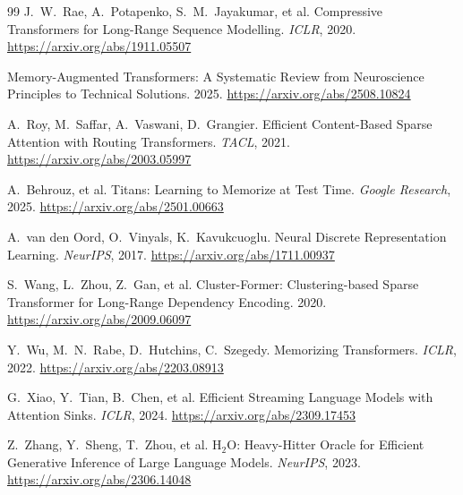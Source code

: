 \documentclass[11pt]{article}
\begin{document}
\begin{thebibliography}{99}
 J.~W.~Rae, A.~Potapenko, S.~M.~Jayakumar, et al.
Compressive Transformers for Long-Range Sequence Modelling. \emph{ICLR}, 2020.
\url{https://arxiv.org/abs/1911.05507}

 Memory-Augmented Transformers: A Systematic Review from
Neuroscience Principles to Technical Solutions. 2025. \url{https://arxiv.org/abs/2508.10824}

 A.~Roy, M.~Saffar, A.~Vaswani, D.~Grangier. Efficient
Content-Based Sparse Attention with Routing Transformers. \emph{TACL}, 2021.
\url{https://arxiv.org/abs/2003.05997}

 A.~Behrouz, et al. Titans: Learning to Memorize at Test Time.
\emph{Google Research}, 2025. \url{https://arxiv.org/abs/2501.00663}

 A.~van den Oord, O.~Vinyals, K.~Kavukcuoglu.
Neural Discrete Representation Learning. \emph{NeurIPS}, 2017.
\url{https://arxiv.org/abs/1711.00937}

 S.~Wang, L.~Zhou, Z.~Gan, et al. Cluster-Former:
Clustering-based Sparse Transformer for Long-Range Dependency Encoding. 2020.
\url{https://arxiv.org/abs/2009.06097}

 Y.~Wu, M.~N.~Rabe, D.~Hutchins, C.~Szegedy. Memorizing
Transformers. \emph{ICLR}, 2022. \url{https://arxiv.org/abs/2203.08913}

 G.~Xiao, Y.~Tian, B.~Chen, et al. Efficient
Streaming Language Models with Attention Sinks. \emph{ICLR}, 2024.
\url{https://arxiv.org/abs/2309.17453}

 Z.~Zhang, Y.~Sheng, T.~Zhou, et al. H$_2$O:
Heavy-Hitter Oracle for Efficient Generative Inference of Large Language Models. \emph{NeurIPS},
2023. \url{https://arxiv.org/abs/2306.14048}

\end{thebibliography}
\end{document}
